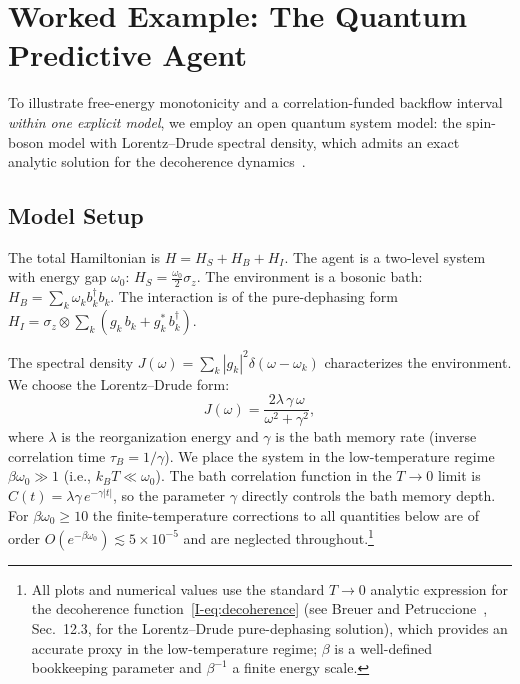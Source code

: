 \documentclass[12pt,a4paper,openany]{book}
\begin{document}
\section{Worked Example: The Quantum Predictive Agent}
\label{I-sec:example}

To illustrate free-energy monotonicity and a correlation-funded
backflow interval \emph{within one explicit model}, we employ an open quantum
system model: the spin-boson model with Lorentz--Drude spectral
density, which admits an exact analytic solution for the
decoherence dynamics~\cite{BreuerPetruccione2002}.

\subsection{Model Setup}

The total Hamiltonian is $H = H_S + H_B + H_I$.
The agent is a two-level system with energy gap $\omega_0$:
$H_S = \tfrac{\omega_0}{2}\sigma_z$.
The environment is a bosonic bath:
$H_B = \sum_k \omega_k b_k^\dagger b_k$.
The interaction is of the pure-dephasing form
$H_I = \sigma_z \otimes \sum_k (g_k\, b_k
+ g_k^*\, b_k^\dagger)$.

The spectral density
$J(\omega) = \sum_k |g_k|^2 \delta(\omega - \omega_k)$
characterizes the environment. We choose the Lorentz--Drude form:
\begin{equation}
\label{I-eq:lorentz_drude}
J(\omega) = \frac{2\lambda\, \gamma\, \omega}
  {\omega^2 + \gamma^2},
\end{equation}
where $\lambda$ is the reorganization energy and $\gamma$ is the
bath memory rate (inverse correlation time
$\tau_B = 1/\gamma$).
We place the system in the low-temperature regime
$\beta\omega_0 \gg 1$ (i.e., $k_BT \ll \omega_0$).
The bath correlation function in the $T \to 0$ limit is
$C(t) = \lambda\gamma\, e^{-\gamma|t|}$, so the parameter
$\gamma$ directly controls the bath memory depth.
For $\beta\omega_0 \geq 10$ the finite-temperature corrections
to all quantities below are of order
$O(e^{-\beta\omega_0}) \lesssim 5 \times 10^{-5}$ and
are neglected throughout.\footnote{All plots and numerical values
use the standard $T \to 0$ analytic expression for the
decoherence function~\eqref{I-eq:decoherence}
(see Breuer and Petruccione~\cite{BreuerPetruccione2002},
Sec.~12.3, for the Lorentz--Drude pure-dephasing solution),
which provides an accurate proxy in the low-temperature
regime;
$\beta$ is a well-defined bookkeeping parameter and
$\beta^{-1}$ a finite energy scale.}
\end{document}
